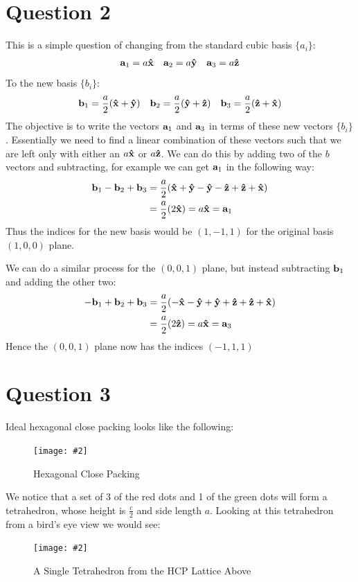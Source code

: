 \documentclass[12pt]{article}
\newcommand{\fig}[3]{
  \begin{figure}[H]
    \centering\texttt{[image: \#2]}\caption{#3}
  \end{figure}}
\begin{document}
\section*{Question 2}
This is a simple question of changing from the standard cubic basis $\{a_i\}$:
\begin{align*}
  \vb{a}_1=a\vu{x}\quad\vb{a}_2=a\vu{y}\quad\vb{a}_3=a\vu{z}
\end{align*}
To the new basis $\{b_i\}$:
\begin{align*}
  \vb{b}_1=\frac{a}{2}\qty(\vu{x}+\vu{y})\quad
  \vb{b}_2=\frac{a}{2}\qty(\vu{y}+\vu{z})\quad
  \vb{b}_3=\frac{a}{2}\qty(\vu{z}+\vu{x})
\end{align*}
The objective is to write the vectors $\vb{a}_1$ and $\vb{a}_3$ in terms of these new vectors $\{b_i\}$. Essentially we need to find a linear combination of these vectors such that we are left only with either an $a\vu{x}$ or $a\vu{z}$. We can do this by adding two of the $b$ vectors and subtracting, for example we can get $\vb{a}_1$ in the following way:
\begin{align*}
  \vb{b}_1-\vb{b}_2+\vb{b}_3&=
  \frac{a}{2}\qty(\vu{x}+\vu{y}-\vu{y}-\vu{z}+\vu{z}+\vu{x})\\
  &=\frac{a}{2}\qty(2\vu{x})=a\vu{x}=\vb{a}_1
\end{align*}
Thus the indices for the new basis would be $(1,-1,1)$ for the original basis $(1,0,0)$ plane.

We can do a similar process for the $(0,0,1)$ plane, but instead subtracting $\vb{b}_1$ and adding the other two:
\begin{align*}
  -\vb{b}_1+\vb{b}_2+\vb{b}_3&=
  \frac{a}{2}\qty(-\vu{x}-\vu{y}+\vu{y}+\vu{z}+\vu{z}+\vu{x})\\
  &=\frac{a}{2}\qty(2\vu{z})=a\vu{x}=\vb{a}_3
\end{align*}
Hence the $(0,0,1)$ plane now has the indices $(-1,1,1)$
\section*{Question 3}
Ideal hexagonal close packing looks like the following:

\fig{8.0}{hcp1.png}{Hexagonal Close Packing}

We notice that a set of 3 of the red dots and 1 of the green dots will form a tetrahedron, whose height is $\frac{c}{2}$ and side length $a$. Looking at this tetrahedron from a bird's eye view we would see:

\fig{6.0}{hcp2.png}{A Single Tetrahedron from the HCP Lattice Above}
\end{document}
